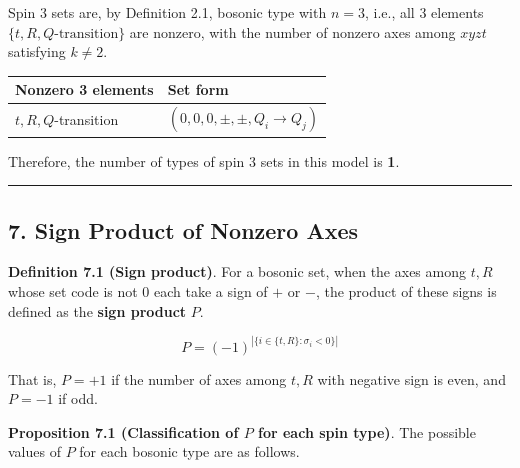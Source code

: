 \documentclass[
  a4paper,11pt]{article}
\newcounter{none}
\theoremstyle{definition}
\theoremstyle{remark}
\begin{document}
Spin 3 sets are, by Definition 2.1, bosonic type with \(n = 3\), i.e.,
all 3 elements \(\{t, R, Q\text{-transition}\}\) are nonzero, with the
number of nonzero axes among \(xyzt\) satisfying \(k \neq 2\).

{\def\LTcaptype{none} %
\begin{longtable}[]{@{}ll@{}}
\toprule\noalign{}
Nonzero 3 elements & Set form \\
\midrule\noalign{}
\endhead
\bottomrule\noalign{}
\endlastfoot
\(t, R, Q\)-transition & \((0, 0, 0, \pm, \pm, Q_i \to Q_j)\) \\
\end{longtable}
}

Therefore, the number of types of spin 3 sets in this model is
\textbf{1}.

\begin{center}\rule{0.5\linewidth}{0.5pt}\end{center}

\subsection{7. Sign Product of Nonzero
Axes}\label{sign-product-of-nonzero-axes}

\textbf{Definition 7.1 (Sign product)}. For a bosonic set, when the axes
among \(t, R\) whose set code is not \(0\) each take a sign of \(+\) or
\(-\), the product of these signs is defined as the \textbf{sign
product} \(P\).

\[P = (-1)^{|\{i \in \{t, R\} : \sigma_i < 0\}|}\]

That is, \(P = +1\) if the number of axes among \(t, R\) with negative
sign is even, and \(P = -1\) if odd.

\textbf{Proposition 7.1 (Classification of \(P\) for each spin type)}.
The possible values of \(P\) for each bosonic type are as follows.
\end{document}
